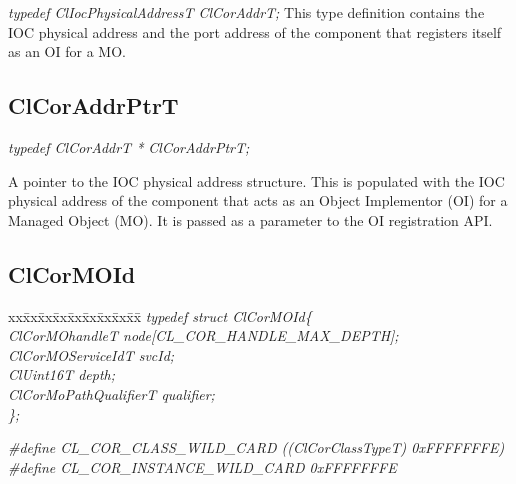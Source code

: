 \begin{flushleft}
\textit{typedef ClIocPhysicalAddressT ClCorAddrT;}
\newline
\newline
This type definition contains the IOC physical address and the port address of the component that registers itself as an OI for a MO.


\subsection{ClCorAddrPtrT}

\textit{typedef ClCorAddrT * ClCorAddrPtrT; }

A pointer to the IOC physical address structure. This is populated with the IOC physical address of the component 
that acts as an Object Implementor (OI) for a Managed Object (MO). It is passed as a parameter to the OI registration API.



\subsection{ClCorMOId}

\begin{tabbing}
xx\=xx\=xx\=xx\=xx\=xx\=xx\=xx\=xx\=\kill
\textit{typedef struct ClCorMOId\{}\\
\>\>\>\>\textit{ClCorMOhandleT        node[CL\_COR\_HANDLE\_MAX\_DEPTH];}\\
\>\>\>\>\textit{ClCorMOServiceIdT     svcId;}\\
\>\>\>\>\textit{ClUint16T        depth;}\\
\>\>\>\>\textit{ClCorMoPathQualifierT qualifier;}\\
\textit{\};}\end{tabbing}
\textit{\#define CL\_\-COR\_\-CLASS\_\-WILD\_\-CARD ((ClCorClassTypeT) 0xFFFFFFFE)}
\newline
\newline
\textit{\#define CL\_\-COR\_\-INSTANCE\_\-WILD\_\-CARD 0xFFFFFFFE}


\end{flushleft}
